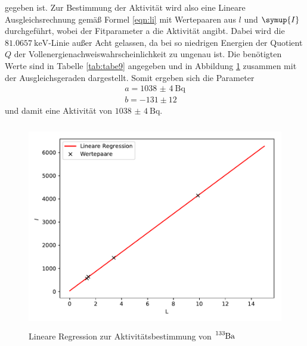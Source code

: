 gegeben ist. Zur Bestimmung der Aktivität wird also eine Lineare Ausgleichsrechnung
gemäß Formel \ref{eqn:li} mit Wertepaaren aus $l$ und $\symup{I}$ durchgeführt,
wobei der Fitparameter a die Aktivität angibt. Dabei wird die $\SI{81.0657}{\kilo\electronvolt}$-Linie
außer Acht gelassen, da bei so niedrigen Energien der Quotient $Q$ der Vollenergienachweiswahrscheinlichkeit
zu ungenau ist.
Die benötigten Werte sind in Tabelle \ref{tab:tabe9} angegeben und in Abbildung \ref{fig:plot9}
zusammen mit der Ausgleichsgeraden dargestellt. Somit ergeben sich die Parameter
\begin{align*}
  a = \SI{1038(4)}{\becquerel}\\
  b = -131 \pm 12
\end{align*}
und damit eine Aktivität von $\SI{1038(4)}{\becquerel} $.

\begin{figure}[H]
  \centering
  \includegraphics[height=9cm]{Plot9.pdf}
  \caption{Lineare Regression zur Aktivitätsbestimmung von $\ce{^{133}Ba}$}
  \label{fig:plot9}
\end{figure}




